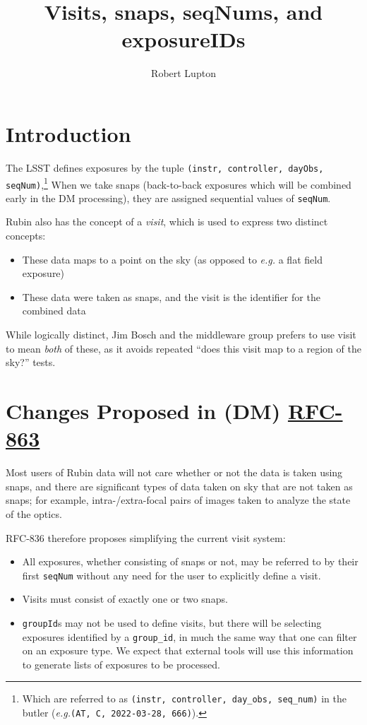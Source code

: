 \documentclass[SE,authoryear,toc]{lsstdoc}
\title{Visits, snaps, seqNums, and exposureIDs}
\author{%
Robert Lupton
}
\date{\vcsDate}
\renewcommand{\eg}{\textit{e.g.}\xspace}
\begin{document}
\maketitle


\section{Introduction}

The LSST defines exposures by the tuple \texttt{(instr, controller, dayObs, seqNum)},\footnote{
  Which are referred to as \texttt{(instr, controller, day\_obs, seq\_num)} in the butler
  (\eg \texttt{(AT, C, 2022-03-28, 666)}).}
When we take snaps (back-to-back exposures which will
be combined early in the DM processing), they are assigned sequential values of \texttt{seqNum}.

Rubin also has the concept of a \textit{visit}, which is used to express two distinct concepts:
\begin{itemize}
\item
  These data maps to a point on the sky (as opposed to \eg a flat field exposure)
\item
  These data were taken as snaps, and the visit is the identifier for the combined data
\end{itemize}
While logically distinct, Jim Bosch and the middleware group prefers to use visit to mean
\textit{both} of these,
as it avoids repeated ``does this visit map to a region of the sky?'' tests.

\section{Changes Proposed in (DM) \href{https://jira.lsstcorp.org/browse/RFC-836}{RFC-863}}

Most users of Rubin data will not care whether or not the data is taken using snaps, and
there are significant types of data taken on sky that are not taken as snaps; for example, intra-/extra-focal
pairs of images taken to analyze the state of the optics.

RFC-836 therefore proposes simplifying the current visit system:
\begin{itemize}
\item
  All exposures, whether consisting of snaps or not, may be referred to by their first
  \texttt{seqNum} without any need for the user to explicitly define a visit.
\item
  Visits must consist of exactly one or two snaps.
\item
  \texttt{groupId}s may not be used to define visits, but there will be selecting
  exposures identified by a \texttt{group\_id}, in much the same way that one can filter on an
  exposure type.  We expect that external tools will use this information to generate
  lists of exposures to be processed.
\end{itemize}
\end{document}
